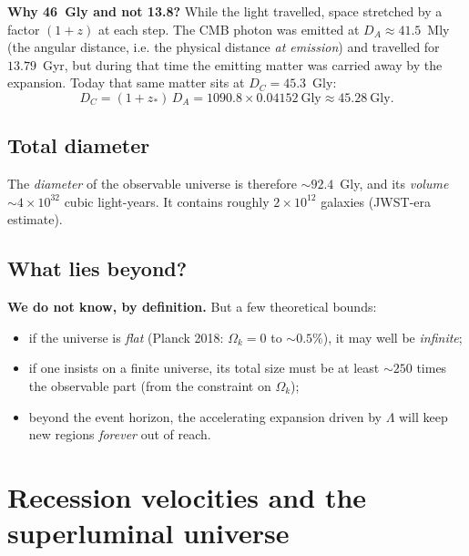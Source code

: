 \documentclass[11pt,a4paper,openany]{report}
\newcommand{\Gly}{\text{Gly}}
\newcommand{\Ok}{\Omega_{k}}
\begin{document}
\begin{tcolorbox}[undergrad]
\textbf{Why 46~Gly and not 13.8?} While the light travelled, space stretched by
a factor $(1+z)$ at each step. The CMB photon was emitted at
$D_A \approx 41.5$~Mly (the angular distance, i.e. the physical distance
\emph{at emission}) and travelled for $13.79$~Gyr, but during that time the
emitting matter was carried away by the expansion. Today that same matter sits
at $D_C = 45.3$~Gly:
\[
D_C = (1+z_*)\,D_A = 1090.8 \times 0.04152~\Gly \approx 45.28~\Gly.
\]
\end{tcolorbox}

\section{Total diameter}

The \emph{diameter} of the observable universe is therefore $\sim 92.4$~Gly, and
its \emph{volume} $\sim 4\times 10^{32}$ cubic light-years. It contains roughly
$2\times 10^{12}$ galaxies (JWST-era estimate).

\section{What lies beyond?}

\begin{tcolorbox}[further]
\textbf{We do not know, by definition.} But a few theoretical bounds:
\begin{itemize}[topsep=2pt]
\item if the universe is \emph{flat} (Planck 2018: $\Ok = 0$ to $\sim 0.5\%$),
  it may well be \emph{infinite};
\item if one insists on a finite universe, its total size must be at least
  $\sim 250$ times the observable part (from the constraint on $\Ok$);
\item beyond the event horizon, the accelerating expansion driven by $\Lambda$
  will keep new regions \emph{forever} out of reach.
\end{itemize}
\end{tcolorbox}

\chapter{Recession velocities and the superluminal universe}
\label{chap:vrec}
\end{document}
